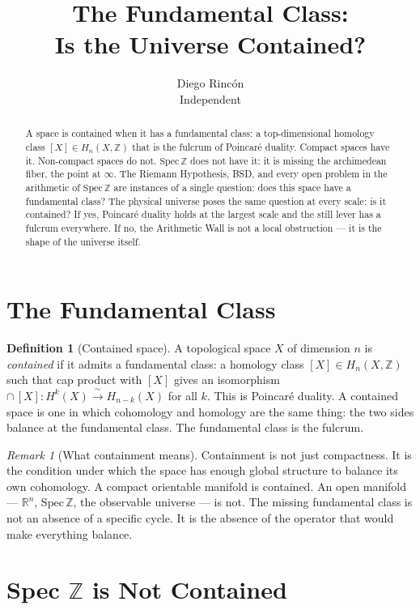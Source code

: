 \documentclass[12pt]{article}
\title{The Fundamental Class:\\
Is the Universe Contained?}
\author{Diego Rinc\'on\\
\small Independent}
\date{}
\theoremstyle{definition}
\newtheorem{definition}[theorem]{Definition}
\theoremstyle{remark}
\newtheorem{remark}[theorem]{Remark}
\begin{document}
\maketitle

\begin{abstract}
A space is contained when it has a fundamental class:
a top-dimensional homology class $[X] \in H_n(X, \mathbb{Z})$
that is the fulcrum of Poincar\'e duality.
Compact spaces have it. Non-compact spaces do not.
$\mathrm{Spec}\,\mathbb{Z}$ does not have it: it is missing
the archimedean fiber, the point at $\infty$.
The Riemann Hypothesis, BSD, and every open problem
in the arithmetic of $\mathrm{Spec}\,\mathbb{Z}$
are instances of a single question:
does this space have a fundamental class?
The physical universe poses the same question at every scale:
is it contained? If yes, Poincar\'e duality holds at the largest scale
and the still lever has a fulcrum everywhere.
If no, the Arithmetic Wall is not a local obstruction ---
it is the shape of the universe itself.
\end{abstract}

\section{The Fundamental Class}

\begin{definition}[Contained space]
A topological space $X$ of dimension $n$ is \emph{contained}
if it admits a fundamental class:
a homology class $[X] \in H_n(X, \mathbb{Z})$ such that
cap product with $[X]$ gives an isomorphism
$\cap\,[X]: H^k(X) \xrightarrow{\;\sim\;} H_{n-k}(X)$
for all $k$.
This is Poincar\'e duality.
A contained space is one in which cohomology and homology
are the same thing: the two sides balance at the fundamental class.
The fundamental class is the fulcrum.
\end{definition}

\begin{remark}[What containment means]
Containment is not just compactness. It is the condition
under which the space has enough global structure
to balance its own cohomology.
A compact orientable manifold is contained.
An open manifold --- $\mathbb{R}^n$, $\mathrm{Spec}\,\mathbb{Z}$,
the observable universe --- is not.
The missing fundamental class is not an absence of a specific cycle.
It is the absence of the operator that would make everything balance.
\end{remark}

\section{Spec $\mathbb{Z}$ is Not Contained}
\end{document}
